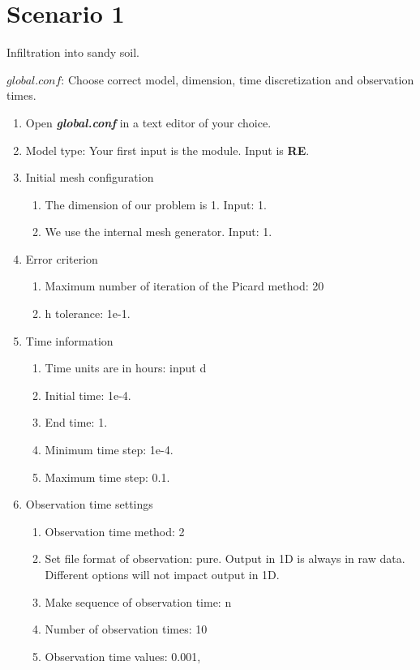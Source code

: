 \newpage

\section*{Scenario 1}

Infiltration into sandy soil. 

$global.conf$: Choose correct model, dimension, time discretization and observation times.
\begin{enumerate}
\item Open \textbf{\emph{global.conf}} in a text editor of your choice. 
\item Model type: Your first input is the module. Input is \textbf{RE}.
\item Initial mesh configuration \begin{enumerate}
\item The dimension of our problem is 1. Input: 1.
\item We use the internal mesh generator. Input: 1. 
\end{enumerate}
\item Error criterion \begin{enumerate} 
\item Maximum number of iteration of the Picard method: 20 
\item h tolerance: 1e-1.
\end{enumerate}
\item Time information 
\begin{enumerate} 
\item Time units are in hours: input d
\item Initial time: 1e-4.
\item End time: 1.
\item Minimum time step: 1e-4.
\item Maximum time step: 0.1.
\end{enumerate}
\item Observation time settings \begin{enumerate}
\item Observation time method: 2
\item Set file format of observation: pure. Output in 1D is always in raw data. Different options will not impact output in 1D.
\item Make sequence of observation time: n
\item Number of observation times: 10
\item Observation time values: 0.001,

\end{enumerate}
\end{enumerate}
